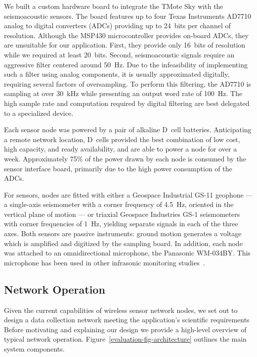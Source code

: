 We built a custom hardware board to integrate the TMote Sky with the
seismoacoustic sensors. The board features up to four Texas Instruments
AD7710 analog to digital converters (ADCs) providing up to 24~bits per
channel of resolution. Although the MSP430 microcontroller provides on-board
ADCs, they are unsuitable for our application. First, they provide only
16~bits of resolution while we required at least 20~bits. Second,
seismoacoustic signals require an aggressive filter centered around 50~Hz.
Due to the infeasibility of implementing such a filter using analog
components, it is usually approximated digitally, requiring several factors
of oversampling. To perform this filtering, the AD7710 is sampling at over
30~kHz while presenting an output word rate of 100~Hz. The high sample rate
and computation required by digital filtering are best delegated to a
specialized device.

Each sensor node was powered by a pair of alkaline D~cell batteries.
Anticipating a remote network location, D~cells provided the best combination
of low cost, high capacity, and ready availability, and are able to power a
node for over a week. Approximately 75\% of the power drawn by each node is
consumed by the sensor interface board, primarily due to the high power
consumption of the ADCs. 

For sensors, nodes are fitted with either a Geospace Industrial GS-11
geophone --- a single-axis seismometer with a corner frequency of 4.5~Hz,
oriented in the vertical plane of motion --- or triaxial Geospace Industries
GS-1 seismometers with corner frequencies of 1~Hz, yielding separate signals
in each of the three axes. Both sensors are passive instruments: ground
motion generates a voltage which is amplified and digitized by the sampling
board. In addition, each node was attached to an omnidirectional microphone,
the Panasonic WM-034BY. This microphone has been used in other infrasonic
monitoring studies~\cite{johnson-etal-04b}.

\subsection{Network Operation}

Given the current capabilities of wireless sensor network nodes, we set out
to design a data collection network meeting the application's scientific
requirements Before motivating and explaining our design we provide a
high-level overview of typical network operation.
Figure~\ref{evaluation-fig-architecture} outlines the main system components.

